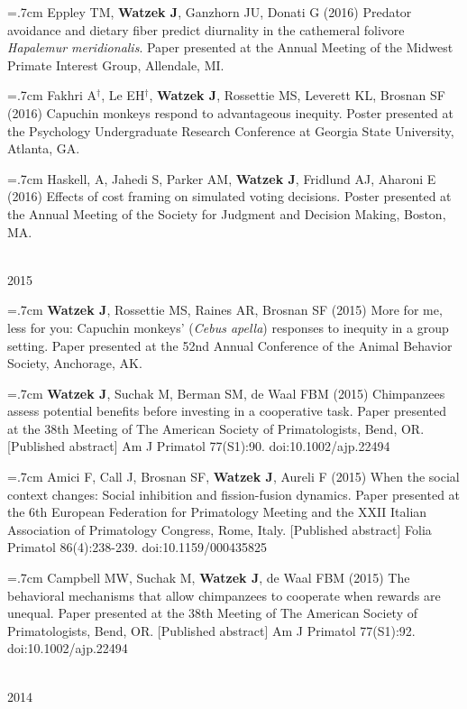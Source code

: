 \documentclass[]{friggeri-cv}
\begin{document}
\hangindent=.7cm Eppley TM, \textbf{Watzek J}, Ganzhorn JU, Donati G (2016) Predator avoidance and dietary fiber predict diurnality in the cathemeral folivore \emph{Hapalemur meridionalis}. Paper presented at the Annual Meeting of the Midwest Primate Interest Group, Allendale, MI.

\hangindent=.7cm Fakhri A${}^\dagger$, Le EH${}^\dagger$, \textbf{Watzek J}, Rossettie MS, Leverett KL, Brosnan SF (2016) Capuchin monkeys respond to advantageous inequity. Poster presented at the Psychology Undergraduate Research Conference at Georgia State University, Atlanta, GA.

\hangindent=.7cm Haskell, A, Jahedi S, Parker AM, \textbf{Watzek J}, Fridlund AJ, Aharoni E (2016) Effects of cost framing on simulated voting decisions. Poster presented at the Annual Meeting of the Society for Judgment and Decision Making, Boston, MA.


{\large{} ~\\[-.15cm] 2015}

\hangindent=.7cm \textbf{Watzek J}, Rossettie MS, Raines AR, Brosnan SF (2015) More for me, less for you: Capuchin monkeys' (\emph{Cebus apella}) responses to inequity in a group setting. Paper presented at the 52nd Annual Conference of the Animal Behavior Society, Anchorage, AK.

\hangindent=.7cm \textbf{Watzek J}, Suchak M, Berman SM, de Waal FBM (2015) Chimpanzees assess potential benefits before investing in a cooperative task. Paper presented at the 38th Meeting of The American Society of Primatologists, Bend, OR. [Published abstract] Am J Primatol 77(S1):90. doi:10.1002/ajp.22494

\hangindent=.7cm Amici F, Call J, Brosnan SF, \textbf{Watzek J}, Aureli F (2015) When the social context changes: Social inhibition and fission-fusion dynamics. Paper presented at the 6th European Federation for Primatology Meeting and the XXII Italian Association of Primatology Congress, Rome, Italy. [Published abstract] Folia Primatol 86(4):238-239. doi:10.1159/000435825

\hangindent=.7cm Campbell MW, Suchak M, \textbf{Watzek J}, de Waal FBM (2015) The behavioral mechanisms that allow chimpanzees to cooperate when rewards are unequal. Paper presented at the 38th Meeting of The American Society of Primatologists, Bend, OR. [Published abstract] Am J Primatol 77(S1):92. doi:10.1002/ajp.22494


{\large{} ~\\[-.15cm] 2014}
\end{document}
